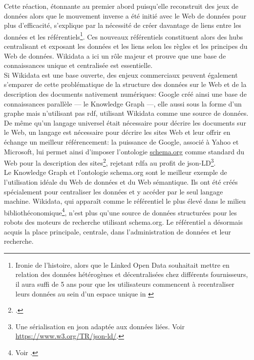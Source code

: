 Cette réaction, étonnante au premier abord puisqu'elle reconstruit des jeux de données alors que le mouvement inverse a été initié avec le Web de données pour plus d'efficacité, s'explique par la nécessité de créer davantage de liens entre les données et les référentiels\footnote{\og Ironie de l’histoire, alors que le Linked Open Data souhaitait mettre en relation des données hétérogènes et décentralisées chez différents fournisseurs, il aura suffi de 5 ans pour que les utilisateurs commencent à recentraliser leurs données au sein d’un espace unique\fg{} in \cite{poupeau_au-a_2018}}. Ces nouveaux référentiels constituent alors des \og hubs\fg{} centralisant et exposant les données et les liens selon les règles et les principes du Web de données. Wikidata a ici un rôle majeur et prouve que une base de connaissances unique et centralisée est essentielle.\\

Si Wikidata est une base ouverte, des enjeux commerciaux peuvent également s'emparer de cette problématique de la structure des données sur le Web et de la description des documents nativement numériques: Google créé ainsi une base de connaissances parallèle --- le Knowledge Graph ---, elle aussi sous la forme d'un graphe mais n'utilisant pas \ac{rdf}, utilisant Wikidata comme une source de données. De même qu'un langage universel était nécessaire pour décrire les documents sur le Web, un langage est nécessaire pour décrire les sites Web et leur offrir en échange un meilleur référencement: la puissance de Google, associé à Yahoo et Microsoft, lui permet ainsi d'imposer l'ontologie \href{https://www.schema.org}{schema.org} comme standard du Web pour la description des sites\footcite{poupeau_au-a_2018}, rejetant \ac{rdf}a au profit de \ac{json}-LD\footnote{Une sérialisation en \ac{json} adaptée aux données liées. Voir \url{https://www.w3.org/TR/json-ld/}.}.\\

Le Knowledge Graph et l'ontologie schema.org sont le meilleur exemple de l'utilisation idéale du Web de données et du Web sémantique. Ils ont été créés spécialement pour centraliser les données et y accéder par le seul langage machine. Wikidata, qui apparaît comme le référentiel le plus élevé dans le milieu bibliothéconomique\footnote{Voir .}, n'est plus qu'une source de données structurées pour les robots des moteurs de recherche utilisant schema.org. Le référentiel a désormais acquis la place principale, centrale, dans l'administration de données et leur recherche.

